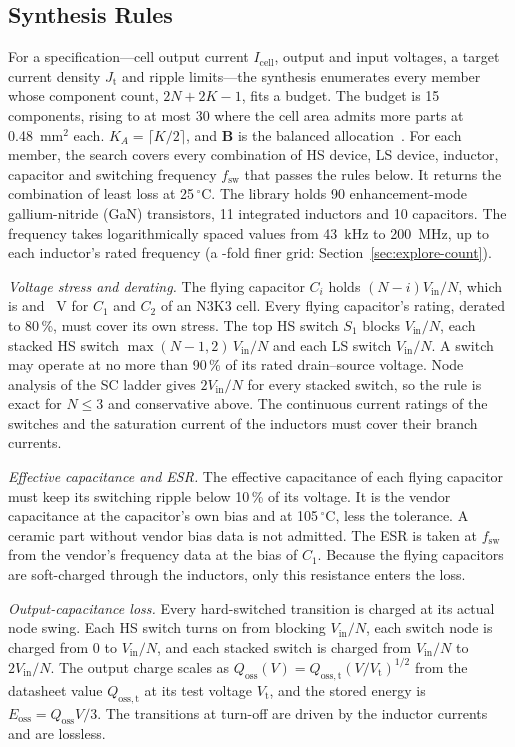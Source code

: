 \subsection{Synthesis Rules}\label{sec:dse-rules}
For a specification---cell output current $I_{\mathrm{cell}}$, output and input voltages, a target
current density $J_{\mathrm{t}}$ and ripple limits---the synthesis enumerates every member whose
component count, $2N+2K-1$, fits a budget. The budget is 15 components, rising to at most 30 where
the cell area admits more parts at 0.48~mm$^2$ each. $K_A = \lceil K/2\rceil$, and $\mathbf{B}$ is
the balanced allocation~\cite{Abdelzaher2026EPEPS}. For each member, the search covers every
combination of HS device, LS device, inductor, capacitor and switching frequency $f_{\mathrm{sw}}$
that passes the rules below. It returns the combination of least loss at 25\,$^\circ$C. The
library holds 90 enhancement-mode gallium-nitride (GaN) transistors, 11 integrated inductors and 10
capacitors. The frequency takes \FrFswCoarseN{} logarithmically spaced values from 43~kHz to
200~MHz, up to each inductor's rated frequency (a \FrFswFineFactor-fold finer grid:
Section~\ref{sec:explore-count}).

\emph{Voltage stress and derating.} The flying capacitor $C_i$ holds $(N-i)V_{\mathrm{in}}/N$,
which is \FrConvCapVone{} and \FrConvCapVtwo~V for $C_1$ and $C_2$ of an N3K3 cell. Every flying capacitor's rating, derated
to 80\,\%, must cover its own stress. The top HS switch $S_1$ blocks $V_{\mathrm{in}}/N$, each
stacked HS switch $\max(N-1,2)\,V_{\mathrm{in}}/N$ and each LS switch $V_{\mathrm{in}}/N$. A switch
may operate at no more than 90\,\% of its rated drain--source voltage. Node analysis of the SC
ladder gives $2V_{\mathrm{in}}/N$ for every stacked switch, so the rule is exact for $N\le3$ and
conservative above. The continuous current ratings of the switches and the saturation current of
the inductors must cover their branch currents.

\emph{Effective capacitance and ESR.} The effective capacitance of each flying capacitor must keep
its switching ripple below 10\,\% of its voltage. It is the vendor capacitance at the capacitor's
own bias and at 105\,$^\circ$C, less the tolerance. A ceramic part without vendor
bias data is not admitted. The ESR is taken at $f_{\mathrm{sw}}$ from the vendor's frequency data
at the bias of $C_1$. Because the flying capacitors are soft-charged through the inductors, only
this resistance enters the loss.

\emph{Output-capacitance loss.} Every hard-switched transition is charged at its actual node
swing. Each HS switch turns on from blocking $V_{\mathrm{in}}/N$, each switch node is charged from
0 to $V_{\mathrm{in}}/N$, and each stacked switch is charged from $V_{\mathrm{in}}/N$ to
$2V_{\mathrm{in}}/N$. The output charge scales as $Q_{\mathrm{oss}}(V) = Q_{\mathrm{oss,t}}
(V/V_{\mathrm{t}})^{1/2}$ from the datasheet value $Q_{\mathrm{oss,t}}$ at its test voltage
$V_{\mathrm{t}}$, and the stored energy is $E_{\mathrm{oss}} = Q_{\mathrm{oss}}V/3$. The
transitions at turn-off are driven by the inductor currents and are lossless.

